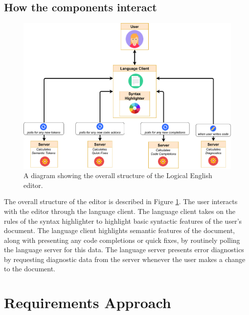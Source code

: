 \documentclass[../main.tex]{subfiles}
\begin{document}
\subsection{How the components interact}
\begin{figure}[h!]
\centering
\includegraphics[width = \linewidth]{figures/le-editor}
\caption{A diagram showing the overall structure of the Logical English editor.}
\label{fig:system-overview}
\end{figure}
The overall structure of the editor is described in Figure \ref{fig:system-overview}. The user interacts with the editor through the language client. The language client takes on the rules of the syntax highlighter to highlight basic syntactic features of the user's document. The language client highlights semantic features of the document, along with presenting any code completions or quick fixes, by routinely polling the language server for this data. The language server presents error diagnostics by requesting diagnostic data from the server whenever the user makes a change to the document.

\section{Requirements Approach}
\end{document}

